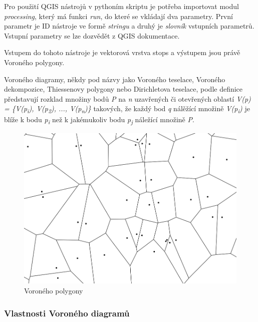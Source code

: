 Pro použití QGIS nástrojů v pythoním skriptu je potřeba importovat modul \textit{processing},
který má funkci \textit{run}, do které se vkládají dva parametry. První parametr je ID nástroje
ve formě \textit{stringu} a druhý je \textit{slovník} vstupních parametrů. Vstupní parametry se lze dozvědět
z QGIS dokumentace. \cite{QGIS_docs}

Vstupem do tohoto nástroje je vektorová vrstva stops a výstupem jsou právě Voroného polygony.

Voroného diagramy, někdy pod názvy jako Voroného teselace, Voroného dekompozice,
Thiessenovy polygony nebo Dirichletova teselace, podle definice představují
rozklad množiny bodů \textit{P} na \textit{n} uzavřených či 
otevřených oblastí \textit{V(p) = \{V(p\textsubscript{i}), V(p\textsubscript{2}), ...,
V(p\textsubscript{n})\}} takových, že každý bod
\textit{q} nálěžící množině \textit{V(p\textsubscript{i})} je blíže k bodu
\textit{p\textsubscript{i}} než k jakémukoliv
bodu \textit{p\textsubscript{j}} náležící množině \textit{P}. \cite{bayer-voronoi}

\begin{figure}[H] \centering
    \includegraphics[width=400pt]{./pictures/voronoi.png}
    \caption[Voroného polygony]{Voroného polygony}
	\label{fig:voronoi}              
\end{figure}     

\subsubsection{Vlastnosti Voroného diagramů}

